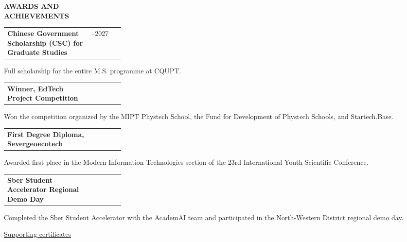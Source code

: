 \documentclass[11pt,a4paper]{article}
\makeatletter
\newcommand{\cvrow}[2]{%
  \noindent
  \begin{minipage}[t]{0.145\textwidth}
    \vspace{0pt}%
    \raggedright
    \fontsize{8.5}{10}\selectfont
    \bfseries\MakeUppercase{#1}
  \end{minipage}%
  \hfill
  \begin{minipage}[t]{0.835\textwidth}
    \vspace{0pt}%
    #2
  \end{minipage}\par
}
\newcommand{\entry}[2]{%
  \begin{tabularx}{\linewidth}{@{}X >{\raggedleft\arraybackslash}p{0.28\linewidth}@{}}
    #1 & #2
  \end{tabularx}
}
\makeatother
\begin{document}
\vspace{0.75em}

\cvrow{Awards and\\Achievements}{%
  \entry
    {\textbf{Chinese Government Scholarship (CSC) for Graduate Studies}}
    {2024--2027}
  Full scholarship for the entire M.S. programme at CQUPT.

  \vspace{0.45em}
  \entry
    {\textbf{Winner, EdTech Project Competition}}
    {2023}
  Won the competition organized by the MIPT Phystech School,
  the Fund for Development of Phystech Schools, and Startech.Base.

  \vspace{0.45em}
  \entry
    {\textbf{First Degree Diploma, Severgeoecotech}}
    {2022}
  Awarded first place in the Modern Information Technologies section of the
  23rd International Youth Scientific Conference.

  \vspace{0.45em}
  \entry
    {\textbf{Sber Student Accelerator Regional Demo Day}}
    {2023}
  Completed the Sber Student Accelerator with the AcademAI team and
  participated in the North-Western District regional demo day.

  \vspace{0.3em}
  \href{https://iasenovets.github.io/files/certificates_selected_en_public_ready_v2.pdf}
       {\small Supporting certificates}
}
\end{document}
